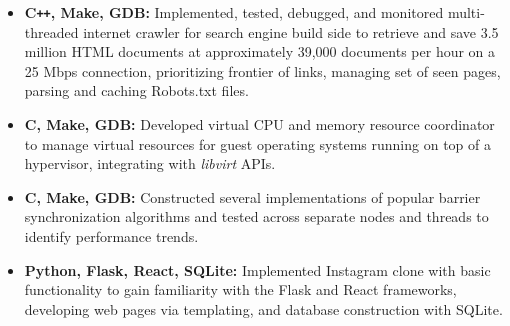 \documentclass[overlapped]{res}
\begin{document}
\begin{resume}
\begin{itemize}[label={}]  \itemsep -2pt %
    \item \textbf{C\texttt{++}, Make, GDB:}
        Implemented, tested, debugged, and monitored multi-threaded internet crawler
        for search engine build side to retrieve and save 3.5 million HTML documents
        at approximately 39,000 documents per hour on a 25 Mbps connection,
        prioritizing frontier of links, managing set of seen pages, parsing and caching Robots.txt files.
    \item \textbf{C, Make, GDB:}
        Developed virtual CPU and memory resource coordinator to manage
        virtual resources for guest operating systems running on top of a hypervisor,
        integrating with \textit{libvirt} APIs.
    \item \textbf{C, Make, GDB:}
        Constructed several implementations of popular barrier synchronization
        algorithms and tested across separate nodes and threads to identify
        performance trends.
    \item \textbf{Python, Flask, React, SQLite:}
        Implemented Instagram clone with basic functionality 
        to gain familiarity with the Flask and React frameworks, 
        developing web pages via templating, 
        and database construction with SQLite.

\end{itemize}
\end{resume}
\end{document}
